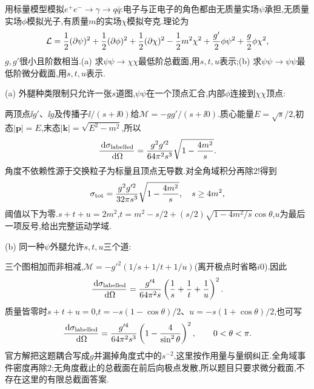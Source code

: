 \begin{exercise}
用标量模型模拟$e^+e^-\to\gamma\to q\bar q$:电子与正电子的角色都由无质量实场$\psi$承担,无质量实场$\phi$模拟光子,有质量$m$的实场$\chi$模拟夸克.理论为
\[
 \mathcal L=\frac12(\partial\psi)^2+\frac12(\partial\phi)^2+\frac12(\partial\chi)^2
 -\frac12m^2\chi^2+\frac{g'}2\phi\psi^2+\frac g2\phi\chi^2,
\]
$g,g'$很小且阶数相当.(a) 求$\psi\psi\to\chi\chi$最低阶总截面,用$s,t,u$表示;(b) 求$\psi\psi\to\psi\psi$最低阶微分截面,用$s,t,u$表示.
\end{exercise}
\begin{solution}
(a) 外腿种类限制只允许一张$s$道图,$\psi\psi$在一个顶点汇合,内部$\phi$连接到$\chi\chi$顶点:
\begin{center}\end{center}
两顶点$\ii g'$、$\ii g$及传播子$\ii/(s+\ii0)$给$\mathcal M=-gg'/(s+\ii0)$.质心能量$E=\sqrt s/2$,初态$|\mathbf p|=E$,末态$|\mathbf k|=\sqrt{E^2-m^2}$,所以
\[
 \frac{\,\mathrm d\sigma_{\rm labelled}}{\,\mathrm d\Omega}=\frac{g^2g'^2}{64\pi^2s^3}
 \sqrt{1-\frac{4m^2}{s}}.
\]
角度不依赖性源于交换粒子为标量且顶点无导数.对全角域积分再除$2!$得到
\[
 \sigma_{\rm tot}=\frac{g^2g'^2}{32\pi s^3}\sqrt{1-\frac{4m^2}{s}},\quad s\geq4m^2,
\]
阈值以下为零.$s+t+u=2m^2$,$t=m^2-s/2+(s/2)\sqrt{1-4m^2/s}\cos\theta$,$u$为最后一项反号,给出完整运动学域.

(b) 同一种$\psi$外腿允许$s,t,u$三个道:
\begin{center}\end{center}
三个图相加而非相减,$\mathcal M=-g'^2(1/s+1/t+1/u)$(离开极点时省略$i0$).因此
\[
 \frac{\,\mathrm d\sigma_{\rm labelled}}{\,\mathrm d\Omega}=
 \frac{g'^4}{64\pi^2s}\left(\frac1s+\frac1t+\frac1u\right)^2.
\]
质量皆零时$s+t+u=0$,$t=-s(1-\cos\theta)/2$、$u=-s(1+\cos\theta)/2$,也可写
\[
 \frac{\,\mathrm d\sigma_{\rm labelled}}{\,\mathrm d\Omega}
 =\frac{g'^4}{64\pi^2s^3}\left(1-\frac4{\sin^2\theta}\right)^2,
 \qquad0<\theta<\pi.
\]
官方解把这题耦合写成$g$并漏掉角度式中的$s^{-2}$,这里按作用量与量纲纠正.全角域事件密度再除2;无角度截止的总截面在前后向极点发散,所以题目只要求微分截面,不存在这里的有限总截面答案.
\end{solution}

